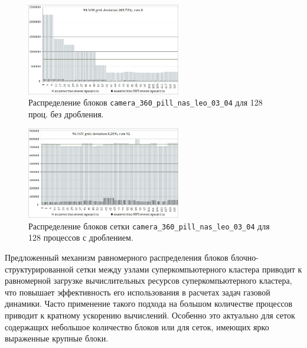 \begin{figure}[ht]
	\centering
	\includegraphics[width=0.6\textwidth]{./pics/text_2_withcut/chart7.jpg}
	\caption{Распределение блоков \texttt{camera\_360\_pill\_nas\_leo\_03\_04}  для 128 проц. без дробления.}
	\label{fig:text_2_withcut_chart7}
\end{figure}

\begin{figure}[ht]
	\centering
	\includegraphics[width=0.6\textwidth]{./pics/text_2_withcut/chart8.jpg}
	\caption{Распределение блоков сетки \texttt{camera\_360\_pill\_nas\_leo\_03\_04} для 128 процессов с дроблением.}
	\label{fig:text_2_withcut_chart8}
\end{figure}

Предложенный механизм равномерного распределения блоков блочно-структурированной сетки между узлами суперкомпьютерного кластера приводит к равномерной загрузке вычислительных ресурсов суперкомпьютерного кластера, что повышает эффективность его использования в расчетах задач газовой динамики. Часто применение такого подхода на большом количестве процессов приводит к кратному ускорению вычислений. Особенно это актуально для сеток содержащих небольшое количество блоков или для сеток, имеющих ярко выраженные крупные блоки.
